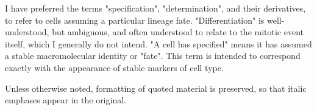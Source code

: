 I have preferred the terms "specification", "determination", and their derivatives, to refer to cells assuming a particular lineage fate. "Differentiation" is well-understood, but ambiguous, and often understood to relate to the mitotic event itself, which I generally do not intend. "A cell has specified" means it has assumed a stable macromolecular identity or "fate". This term is intended to correspond exactly with the appearance of stable markers of cell type.

Unless otherwise noted, formatting of quoted material is preserved, so that italic emphases appear in the original.